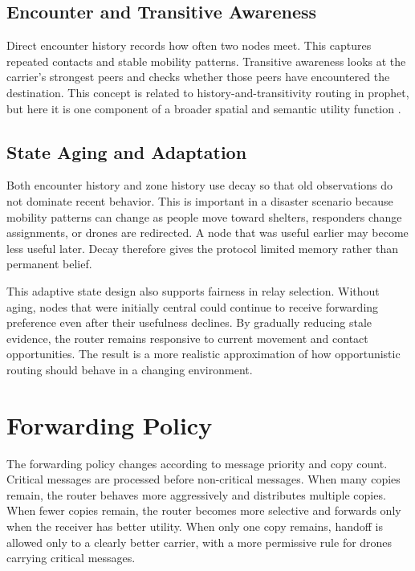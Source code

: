 \subsection{Encounter and Transitive Awareness}
Direct encounter history records how often two nodes meet. This captures repeated contacts and stable mobility patterns. Transitive awareness looks at the carrier's strongest peers and checks whether those peers have encountered the destination. This concept is related to history-and-transitivity routing in \ac{prophet}, but here it is one component of a broader spatial and semantic utility function \citep{lindgren2012prophet}.

\subsection{State Aging and Adaptation}
Both encounter history and zone history use decay so that old observations do not dominate recent behavior. This is important in a disaster scenario because mobility patterns can change as people move toward shelters, responders change assignments, or drones are redirected. A node that was useful earlier may become less useful later. Decay therefore gives the protocol limited memory rather than permanent belief.

This adaptive state design also supports fairness in relay selection. Without aging, nodes that were initially central could continue to receive forwarding preference even after their usefulness declines. By gradually reducing stale evidence, the router remains responsive to current movement and contact opportunities. The result is a more realistic approximation of how opportunistic routing should behave in a changing environment.

\section{Forwarding Policy}
The forwarding policy changes according to message priority and copy count. Critical messages are processed before non-critical messages. When many copies remain, the router behaves more aggressively and distributes multiple copies. When fewer copies remain, the router becomes more selective and forwards only when the receiver has better utility. When only one copy remains, handoff is allowed only to a clearly better carrier, with a more permissive rule for drones carrying critical messages.

